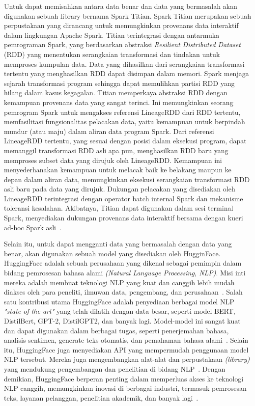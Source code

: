 Untuk dapat memisahkan antara data benar dan data yang bermasalah 
akan digunakan sebuah library bernama Spark Titian. Spark Titian 
merupakan sebuah perpustakaan yang dirancang untuk memungkinkan 
provenans data interaktif dalam lingkungan Apache Spark. Titian 
terintegrasi dengan antarmuka pemrograman Spark, yang berdasarkan 
abstraksi \emph{Resilient Distributed Dataset} (RDD) yang menentukan 
serangkaian transformasi dan tindakan untuk memproses kumpulan data. 
Data yang dihasilkan dari serangkaian transformasi tertentu yang 
menghasilkan RDD dapat disimpan dalam memori. Spark menjaga sejarah 
transformasi program sehingga dapat memulihkan partisi RDD yang 
hilang dalam kasus kegagalan. Titian memperkaya abstraksi RDD 
dengan kemampuan provenans data yang sangat terinci. Ini 
memungkinkan seorang pemrogram Spark untuk mengakses referensi 
LineageRDD dari RDD tertentu, memfasilitasi fungsionalitas 
pelacakan data, yaitu kemampuan untuk berpindah mundur 
(atau maju) dalam aliran data program Spark. Dari referensi 
LineageRDD tertentu, yang sesuai dengan posisi dalam eksekusi 
program, dapat memanggil transformasi RDD asli apa pun, 
menghasilkan RDD baru yang memproses subset data yang 
dirujuk oleh LineageRDD. Kemampuan ini menyederhanakan 
kemampuan untuk melacak baik ke belakang maupun ke depan 
dalam aliran data, memungkinkan eksekusi serangkaian transformasi 
RDD asli baru pada data yang dirujuk. Dukungan pelacakan yang 
disediakan oleh LineageRDD terintegrasi dengan operator batch 
internal Spark dan mekanisme toleransi kesalahan. Akibatnya, 
Titian dapat digunakan dalam sesi terminal Spark, menyediakan 
dukungan provenans data interaktif bersama dengan kueri ad-hoc 
Spark asli~\cite{interlandi2015}.

Selain itu, untuk dapat mengganti data yang bermasalah dengan 
data yang benar, akan digunakan sebuah model yang disediakan 
oleh HugginFace. HuggingFace adalah sebuah perusahaan yang 
dikenal sebagai pemimpin dalam bidang pemrosesan bahasa alami 
\emph{(Natural Language Processing, NLP)}. Misi inti mereka adalah 
membuat teknologi NLP yang kuat dan canggih lebih mudah diakses 
oleh para peneliti, ilmuwan data, pengembang, dan 
perusahaan~\cite{huggingface}. Salah satu kontribusi 
utama HuggingFace adalah penyediaan berbagai model NLP 
\emph{"state-of-the-art"} yang telah dilatih dengan data 
besar, seperti model BERT, DistilBert, GPT-2, DistilGPT2, 
dan banyak lagi. Model-model ini sangat kuat dan dapat 
digunakan dalam berbagai tugas, seperti penerjemahan bahasa, 
analisis sentimen, generate teks otomatis, dan pemahaman 
bahasa alami~\cite{wolf2020}. Selain itu, HuggingFace juga 
menyediakan API yang mempermudah penggunaan model NLP 
tersebut. Mereka juga mengembangkan alat-alat dan 
perpustakaan \emph{(library)} yang mendukung pengembangan 
dan penelitian di bidang NLP~\cite{inference}. Dengan demikian, 
HuggingFace berperan penting dalam memperluas akses ke teknologi 
NLP canggih, memungkinkan inovasi di berbagai industri, termasuk 
pemrosesan teks, layanan pelanggan, penelitian akademik, dan 
banyak lagi~\cite{azure}.

